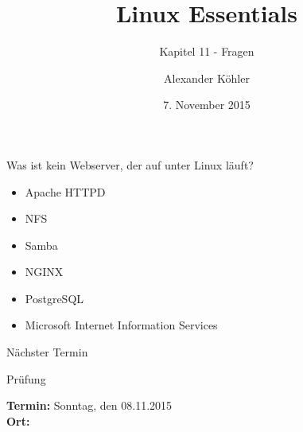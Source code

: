 \documentclass[aspectratio=43]{beamer}
\title[Linux Essentials  - Kapitel 11 - Fragen]{Linux Essentials}
\subtitle{Kapitel 11 - Fragen}
\author{Alexander Köhler}
\date{7. November 2015}
\begin{document}
\logoframe

\frame{\titlepage}


\setcounter{tocdepth}{1}
\section[Gliederung]{}
\frame{\tableofcontents}



\begin{frame}{}
  \begin{block}{Was ist kein Webserver, der auf unter Linux läuft?}
    \begin{itemize}
      \item Apache HTTPD
      \item NFS
      \item Samba
      \item NGINX
      \item PostgreSQL
      \item Microsoft Internet Information Services
    \end{itemize}
  \end{block}
\end{frame}

\begin{frame}[plain]
  \begin{alertblock}{Nächster Termin}
    \begin{center}
      

    \Huge{Prüfung}
    \end{center}
    \textbf{Termin:} Sonntag, den 08.11.2015 \\
    \textbf{Ort:} \\
  \end{alertblock}
\end{frame}


\materialframe
\end{document}
